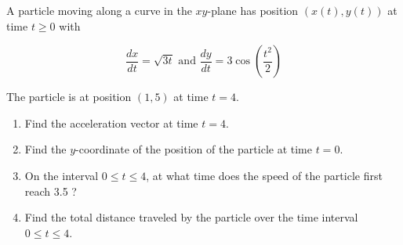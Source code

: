 \documentclass[12pt]{exam}
\begin{document}
A particle moving along a curve in the $x y$-plane has position $(x(t), y(t))$ at time $t \geq 0$ with

$$
\frac{d x}{d t}=\sqrt{3 t} \text { and } \frac{d y}{d t}=3 \cos \left(\frac{t^{2}}{2}\right)
$$

The particle is at position $(1,5)$ at time $t=4$.
\begin{enumerate}
\item Find the acceleration vector at time $t=4$.
\item Find the $y$-coordinate of the position of the particle at time $t=0$.
\item On the interval $0 \leq t \leq 4$, at what time does the speed of the particle first reach 3.5 ?
\item Find the total distance traveled by the particle over the time interval $0 \leq t \leq 4$.
\end{enumerate}
\end{document}

